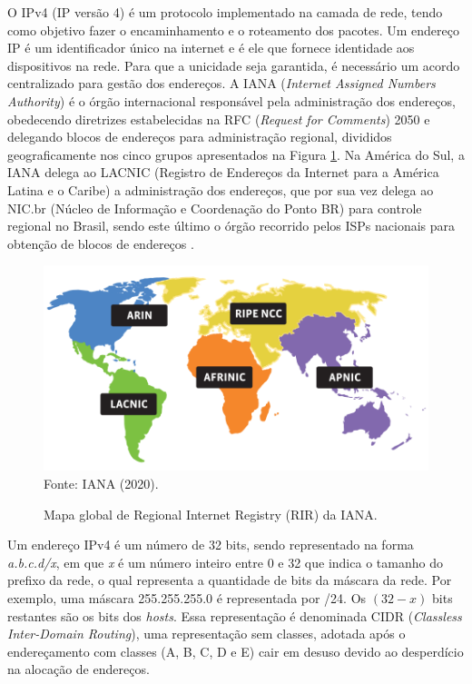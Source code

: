     O IPv4 (IP versão 4) é um protocolo implementado na camada de rede, tendo como objetivo fazer o encaminhamento e o roteamento dos pacotes. Um endereço IP é um identificador único na internet e é ele que fornece identidade aos dispositivos na rede. Para que a unicidade seja garantida, é necessário um acordo centralizado para gestão dos endereços. A IANA (\textit{Internet Assigned Numbers Authority}) é o órgão internacional responsável pela administração dos endereços, obedecendo diretrizes estabelecidas na RFC (\textit{Request for Comments}) 2050 e delegando blocos de endereços para administração regional, divididos geograficamente nos cinco grupos apresentados na Figura \ref{fig:rir_map}. Na América do Sul, a IANA delega ao LACNIC (Registro de Endereços da Internet para a América Latina e o Caribe) a administração dos endereços, que por sua vez delega ao NIC.br (Núcleo de Informação e Coordenação do Ponto BR) para controle regional no Brasil, sendo este último o órgão recorrido pelos ISPs nacionais para obtenção de blocos de endereços \cite{iana2020}.
    
    \begin{figure}[!htb]
        \centering
        \caption{Mapa global de Regional Internet Registry (RIR) da IANA.} 
        \label{fig:rir_map} 
        \includegraphics[scale=1.5]{img/rir-map.png} \\
        {\small Fonte: IANA (2020).} 
    \end{figure}
    

    Um endereço IPv4 é um número de 32 bits, sendo representado na forma \textit{a.b.c.d/x}, em que \textit{x} é um número inteiro entre 0 e 32 que indica o tamanho do prefixo da rede, o qual representa a quantidade de bits da máscara da rede. Por exemplo, uma máscara 255.255.255.0 é representada por /24. Os $(32 - x)$ bits restantes são os bits dos \textit{hosts}. Essa representação é denominada CIDR (\textit{Classless Inter-Domain Routing}), uma representação sem classes, adotada após o endereçamento com classes (A, B, C, D e E) cair em desuso devido ao desperdício na alocação de endereços.
    
